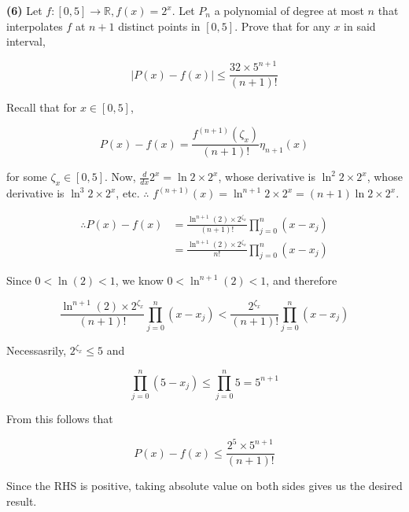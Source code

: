 \documentclass[12pt]{article}
\theoremstyle{definition}
\begin{document}
\pagebreak 

\begin{shaded}
    \textbf{(6)} Let $f : [0, 5] \to \mathbb{R}, f(x) =2^x$. Let $P_n$ a
    polynomial of degree at most $n$ that interpolates $f$ at $n+1$ distinct
    points in $[0, 5]$. Prove that for any $x$ in said interval, 

\begin{equation*}
    \left| P(x) - f(x) \right| \leq \frac{32 \times 5^{n+1}}{(n+1)!}
\end{equation*}
\end{shaded}

Recall that for $x \in [0, 5]$,

\begin{equation*}
P(x) - f(x) = \frac{f^{(n+1)}(\zeta_x)}{(n+1)!} \eta_{n+1}(x)
\end{equation*}

for some $\zeta_x \in [0, 5]$. Now, $\frac{d}{dx} 2^x = \ln 2 \times 2^x$, whose
derivative is $\ln^2 2 \times 2^x$, whose derivative is $\ln^3 2 \times 2^x$,
etc. $\therefore$ $f^{(n+1)}( x ) = \ln^{n+1} 2 \times  2^x = (n+1)\ln 2 \times
2^x$.

\begin{align*}
    \therefore P(x) - f(x) 
    &= \frac{\ln^{n+1} (2) \times 2^{\zeta_x}}{(n+1)!} 
    \prod_{j=0}^n(x-x_j) \\ 
    &= \frac{\ln^{n+1}(2) \times 2^{\zeta_x}}{n!}\prod_{j=0}^n(x-x_j)
\end{align*}

Since $0 < \ln(2) < 1$, we know $0 <\ln^{n+1}(2) < 1$, and therefore

\begin{equation*}
    \frac{\ln^{n+1}(2) \times 2^{\zeta_x}}{(n+1)!}\prod_{j=0}^n(x-x_j) <
    \frac{2^{\zeta_x}}{(n+1)!}\prod_{j=0}^n(x-x_j)
\end{equation*}

Necessasrily, $2^{\zeta_x} \leq 5$ and

\begin{equation*}
    \prod_{j=0}^n(5 - x_j) \leq \prod_{j=0}^n 5 = 5^{n+1}
\end{equation*}

From this follows that 

\begin{equation*}
    P(x) - f(x) \leq \frac{2^5 \times 5^{n+1}}{(n+1)!} 
\end{equation*}

Since the RHS is positive, taking absolute value on both sides gives us the
desired result.
\end{document}
